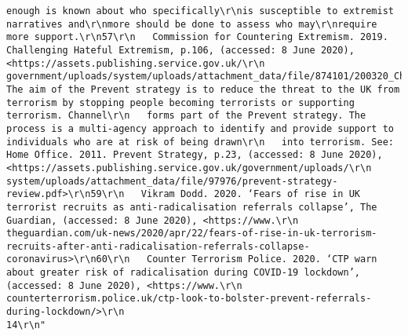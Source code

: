 \documentclass[
]{book}
\begin{document}
\begin{verbatim}
enough is known about who specifically\r\nis susceptible to extremist narratives and\r\nmore should be done to assess who may\r\nrequire more support.\r\n57\r\n   Commission for Countering Extremism. 2019. Challenging Hateful Extremism, p.106, (accessed: 8 June 2020), <https://assets.publishing.service.gov.uk/\r\n   government/uploads/system/uploads/attachment_data/file/874101/200320_Challenging_Hateful_Extremism.pdf>\r\n58\r\n   The aim of the Prevent strategy is to reduce the threat to the UK from terrorism by stopping people becoming terrorists or supporting terrorism. Channel\r\n   forms part of the Prevent strategy. The process is a multi-agency approach to identify and provide support to individuals who are at risk of being drawn\r\n   into terrorism. See: Home Office. 2011. Prevent Strategy, p.23, (accessed: 8 June 2020), <https://assets.publishing.service.gov.uk/government/uploads/\r\n   system/uploads/attachment_data/file/97976/prevent-strategy-review.pdf>\r\n59\r\n   Vikram Dodd. 2020. ‘Fears of rise in UK terrorist recruits as anti-radicalisation referrals collapse’, The Guardian, (accessed: 8 June 2020), <https://www.\r\n   theguardian.com/uk-news/2020/apr/22/fears-of-rise-in-uk-terrorism-recruits-after-anti-radicalisation-referrals-collapse-coronavirus>\r\n60\r\n   Counter Terrorism Police. 2020. ‘CTP warn about greater risk of radicalisation during COVID-19 lockdown’, (accessed: 8 June 2020), <https://www.\r\n   counterterrorism.police.uk/ctp-look-to-bolster-prevent-referrals-during-lockdown/>\r\n                                                                               14\r\n"                                                                                                                                                                                                                                                                                                                                                                                                                                                                                                                                                                                                                                                                                                                                                                                                                                                                                                                                                                                                                                                                                                               

\end{verbatim}
\end{document}
